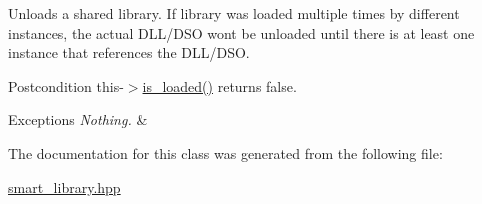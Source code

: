 Unloads a shared library. If library was loaded multiple times by different instances, the actual D\+L\+L/\+D\+SO won\textquotesingle{}t be unloaded until there is at least one instance that references the D\+L\+L/\+D\+SO.

\begin{DoxyPostcond}{Postcondition}
this-\/$>$\hyperlink{a01712_abe903598b2f65c04360d58943cc08255}{is\+\_\+loaded()} returns false. 
\end{DoxyPostcond}

\begin{DoxyExceptions}{Exceptions}
{\em Nothing.} & \\
\hline
\end{DoxyExceptions}


The documentation for this class was generated from the following file\+:\begin{DoxyCompactItemize}
\item 
\hyperlink{a00275}{smart\+\_\+library.\+hpp}\end{DoxyCompactItemize}
